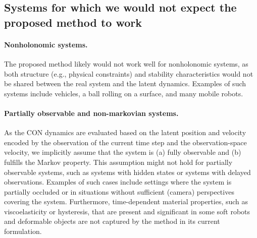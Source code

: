 \subsection{Systems for which we would not expect the proposed method to work}
\paragraph{Nonholonomic systems.}
The proposed method likely would not work well for nonholonomic systems, as both structure (e.g., physical constraints) and stability characteristics would not be shared between the real system and the latent dynamics. Examples of such systems include vehicles, a ball rolling on a surface, and many mobile robots.

\paragraph{Partially observable and non-markovian systems.}
As the CON dynamics are evaluated based on the latent position and velocity encoded by the observation of the current time step and the observation-space velocity, we implicitly assume that the system is (a) fully observable and (b) fulfills the Markov property. This assumption might not hold for partially observable systems, such as systems with hidden states or systems with delayed observations. Examples of such cases include settings where the system is partially occluded or in situations without sufficient (camera) perspectives covering the system. Furthermore, time-dependent material properties, such as viscoelasticity or hysteresis, that are present and significant in some soft robots and deformable objects are not captured by the method in its current formulation.